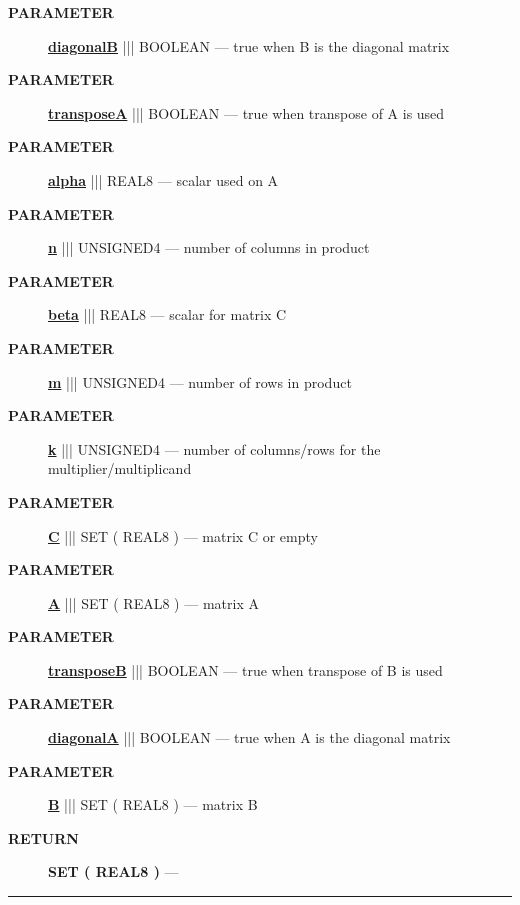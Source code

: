 \par
\begin{description}
\item [\colorbox{tagtype}{\color{white} \textbf{\textsf{PARAMETER}}}] \textbf{\underline{diagonalB}} ||| BOOLEAN --- true when B is the diagonal matrix
\item [\colorbox{tagtype}{\color{white} \textbf{\textsf{PARAMETER}}}] \textbf{\underline{transposeA}} ||| BOOLEAN --- true when transpose of A is used
\item [\colorbox{tagtype}{\color{white} \textbf{\textsf{PARAMETER}}}] \textbf{\underline{alpha}} ||| REAL8 --- scalar used on A
\item [\colorbox{tagtype}{\color{white} \textbf{\textsf{PARAMETER}}}] \textbf{\underline{n}} ||| UNSIGNED4 --- number of columns in product
\item [\colorbox{tagtype}{\color{white} \textbf{\textsf{PARAMETER}}}] \textbf{\underline{beta}} ||| REAL8 --- scalar for matrix C
\item [\colorbox{tagtype}{\color{white} \textbf{\textsf{PARAMETER}}}] \textbf{\underline{m}} ||| UNSIGNED4 --- number of rows in product
\item [\colorbox{tagtype}{\color{white} \textbf{\textsf{PARAMETER}}}] \textbf{\underline{k}} ||| UNSIGNED4 --- number of columns/rows for the multiplier/multiplicand
\item [\colorbox{tagtype}{\color{white} \textbf{\textsf{PARAMETER}}}] \textbf{\underline{C}} ||| SET ( REAL8 ) --- matrix C or empty
\item [\colorbox{tagtype}{\color{white} \textbf{\textsf{PARAMETER}}}] \textbf{\underline{A}} ||| SET ( REAL8 ) --- matrix A
\item [\colorbox{tagtype}{\color{white} \textbf{\textsf{PARAMETER}}}] \textbf{\underline{transposeB}} ||| BOOLEAN --- true when transpose of B is used
\item [\colorbox{tagtype}{\color{white} \textbf{\textsf{PARAMETER}}}] \textbf{\underline{diagonalA}} ||| BOOLEAN --- true when A is the diagonal matrix
\item [\colorbox{tagtype}{\color{white} \textbf{\textsf{PARAMETER}}}] \textbf{\underline{B}} ||| SET ( REAL8 ) --- matrix B
\end{description}







\par
\begin{description}
\item [\colorbox{tagtype}{\color{white} \textbf{\textsf{RETURN}}}] \textbf{SET ( REAL8 )} --- 
\end{description}




\rule{\linewidth}{0.5pt}
